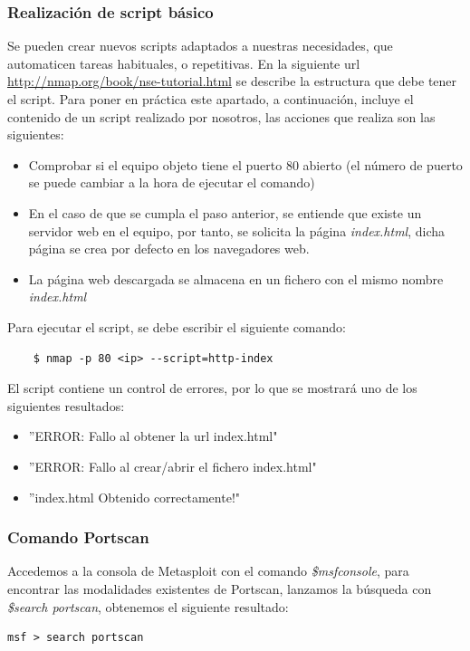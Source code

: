 \documentclass[a4,12pt,onecolum]{article}
\begin{document}
\begin{itemize}
\subsubsection{Realización de script básico}
Se pueden crear nuevos scripts adaptados a nuestras necesidades, que automaticen tareas habituales, o repetitivas. En la siguiente url \url{http://nmap.org/book/nse-tutorial.html} se describe la estructura que debe tener el script. Para poner en práctica este apartado, a continuación, incluye el contenido de un script realizado por nosotros, las acciones que realiza son las siguientes:
\begin{itemize}
\item Comprobar si el equipo objeto tiene el puerto 80 abierto (el número de puerto se puede cambiar a la hora de ejecutar el comando)
\item En el caso de que se cumpla el paso anterior, se entiende que existe un servidor web en el equipo, por tanto, se solicita la página \textit{index.html}, dicha página se crea por defecto en los navegadores web.
\item La página web descargada se almacena en un fichero con el mismo nombre \textit{index.html}
\end{itemize} 
Para ejecutar el script, se debe escribir el siguiente comando:
\begin{verbatim}
	$ nmap -p 80 <ip> --script=http-index 
\end{verbatim}
El script contiene un control de errores, por lo que se mostrará uno de los siguientes resultados:
\begin{itemize}
	\item ''ERROR: Fallo al obtener la url index.html"
	\item ''ERROR: Fallo al crear/abrir el fichero index.html"
	\item ''index.html Obtenido correctamente!"
\end{itemize}

\subsubsection{Comando Portscan}
Accedemos a la consola de Metasploit con el comando \emph{\$msfconsole}, para encontrar las modalidades existentes de Portscan, lanzamos la búsqueda con \emph{\$search portscan}, obtenemos el siguiente resultado:
\begin{verbatim}
msf > search portscan


\end{verbatim}
\end{itemize}
\end{document}
